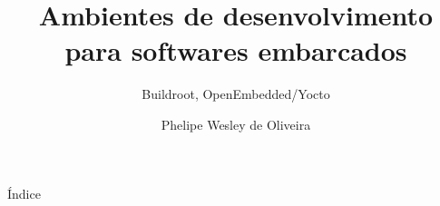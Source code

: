 \documentclass{bredelebeamer}
\title[Titre version courte]{Ambientes de desenvolvimento para softwares embarcados}
\subtitle{Buildroot, OpenEmbedded/Yocto}
\author[Oliveira, P. W.]{Phelipe Wesley de Oliveira\inst{1}}
\institute[UFC]
{
  \inst{1}%
  Universidade Federal do Ceará
  }
\date{}
\begin{document}
\begin{frame}
  \titlepage
\end{frame}

\logo{}



\begin{frame}{Índice}
  \tableofcontents
\end{frame}






\end{document}
